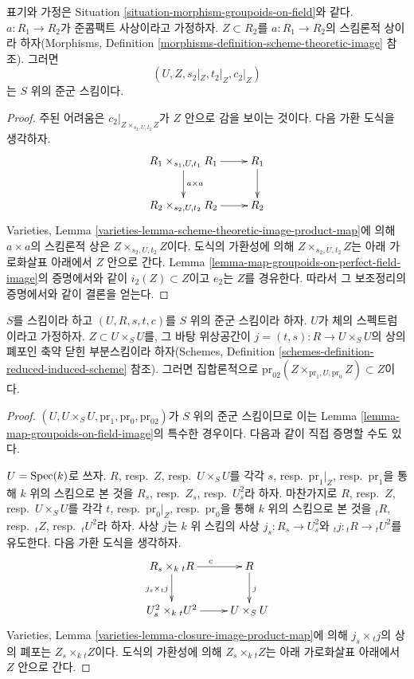 \begin{lemma}
\label{lemma-quasi-compact-map-groupoids-on-field-image}
표기와 가정은 Situation \ref{situation-morphism-groupoids-on-field}와 같다.
$a : R_1 \to R_2$가 준콤팩트 사상이라고 가정하자. $Z \subset R_2$를
$a : R_1 \to R_2$의 스킴론적 상이라 하자(Morphisms, Definition
\ref{morphisms-definition-scheme-theoretic-image} 참조). 그러면
$$
(U, Z, s_2|_Z, t_2|_Z, c_2|_Z)
$$
는 $S$ 위의 준군 스킴이다.
\end{lemma}

\begin{proof}
주된 어려움은 $c_2|_{Z \times_{s_2, U, t_2} Z}$가 $Z$ 안으로 감을
보이는 것이다. 다음 가환 도식을 생각하자.
$$
\xymatrix{
R_1 \times_{s_1, U, t_1} R_1 \ar[r] \ar[d]^{a \times a} & R_1 \ar[d] \\
R_2 \times_{s_2, U, t_2} R_2 \ar[r] & R_2
}
$$
Varieties, Lemma \ref{varieties-lemma-scheme-theoretic-image-product-map}에 의해
$a \times a$의 스킴론적 상은 $Z \times_{s_2, U, t_2} Z$이다.
도식의 가환성에 의해 $Z \times_{s_2, U, t_2} Z$는 아래 가로화살표 아래에서
$Z$ 안으로 간다. Lemma \ref{lemma-map-groupoids-on-perfect-field-image}의
증명에서와 같이 $i_2(Z) \subset Z$이고 $e_2$는 $Z$를 경유한다.
따라서 그 보조정리의 증명에서와 같이 결론을 얻는다.
\end{proof}

\begin{lemma}
\label{lemma-groupoid-on-field-image}
$S$를 스킴이라 하고 $(U, R, s, t, c)$를 $S$ 위의 준군 스킴이라 하자.
$U$가 체의 스펙트럼이라고 가정하자. $Z \subset U \times_S U$를,
그 바탕 위상공간이 $j = (t, s) : R \to U \times_S U$의 상의 폐포인
축약 닫힌 부분스킴이라 하자(Schemes, Definition
\ref{schemes-definition-reduced-induced-scheme} 참조). 그러면 집합론적으로
$\text{pr}_{02}(Z \times_{\text{pr}_1, U, \text{pr}_0} Z) \subset Z$이다.
\end{lemma}

\begin{proof}
$(U, U \times_S U, \text{pr}_1, \text{pr}_0, \text{pr}_{02})$가
$S$ 위의 준군 스킴이므로 이는 Lemma
\ref{lemma-map-groupoids-on-field-image}의 특수한 경우이다.
다음과 같이 직접 증명할 수도 있다.

\medskip\noindent
$U = \mathop{\mathrm{Spec}}(k)$로 쓰자. $R$, resp.\ $Z$, resp.\ $U \times_S U$를 각각
$s$, resp.\ $\text{pr}_1|_Z$, resp.\ $\text{pr}_1$을 통해 $k$ 위의
스킴으로 본 것을 $R_s$, resp.\ $Z_s$, resp.\ $U^2_s$라 하자.
마찬가지로 $R$, resp.\ $Z$, resp.\ $U \times_S U$를 각각
$t$, resp.\ $\text{pr}_0|_Z$, resp.\ $\text{pr}_0$을 통해 $k$ 위의
스킴으로 본 것을 ${}_tR$, resp.\ ${}_tZ$, resp.\ ${}_tU^2$라 하자.
사상 $j$는 $k$ 위 스킴의 사상
$j_s : R_s \to U^2_s$와 ${}_tj : {}_tR \to {}_tU^2$를 유도한다.
다음 가환 도식을 생각하자.
$$
\xymatrix{
R_s \times_k {}_tR \ar[r]^c \ar[d]_{j_s \times {}_tj} &  R \ar[d]^j \\
U^2_s \times_k {}_tU^2 \ar[r] & U \times_S U
}
$$
Varieties, Lemma \ref{varieties-lemma-closure-image-product-map}에 의해
$j_s \times {}_tj$의 상의 폐포는 $Z_s \times_k {}_tZ$이다.
도식의 가환성에 의해 $Z_s \times_k {}_tZ$는 아래 가로화살표 아래에서
$Z$ 안으로 간다.
\end{proof}

